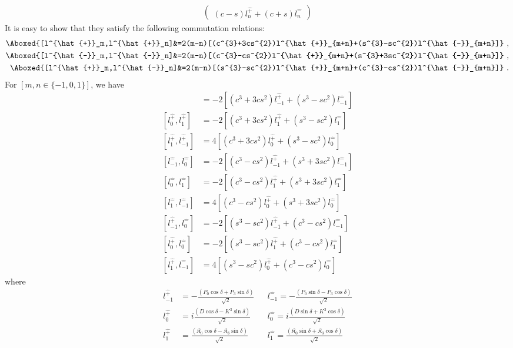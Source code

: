 \documentclass[]{article}
\numberwithin{equation}{section}
\begin{document}
{{\begin{align}
\begin{pmatrix}
        (c-s)l^{\hat{+}}_n+(c+s)l^{\hat{-}}_n
    \end{pmatrix}
\end{align}
It is easy to show that they satisfy the following commutation relations:
\begin{align}
    \Aboxed{[l^{\hat{+}}_m,l^{\hat{+}}_n]&=2(m-n)[(c^{3}+3cs^{2})l^{\hat{+}}_{m+n}+(s^{3}-sc^{2})l^{\hat{-}}_{m+n}]}~,\\
    \Aboxed{[l^{\hat{-}}_m,l^{\hat{-}}_n]&=2(m-n)[(c^{3}-cs^{2})l^{\hat{+}}_{m+n}+(s^{3}+3sc^{2})l^{\hat{-}}_{m+n}]}~,\\
    \Aboxed{[l^{\hat{+}}_m,l^{\hat{-}}_n]&=2(m-n)[(s^{3}-sc^{2})l^{\hat{+}}_{m+n}+(c^{3}-cs^{2})l^{\hat{-}}_{m+n}]}~.
\end{align}
For $[m,n\in\{-1,0,1\}]$, we have
\begin{align}
    [l^{\hat{+}}_{-1},l^{\hat{+}}_{0}]&=-2[(c^{3}+3cs^{2})l^{\hat{+}}_{-1}+(s^{3}-sc^{2})l^{\hat{-}}_{-1}]\\
    [l^{\hat{+}}_{0},l^{\hat{+}}_{1}]&=-2[(c^{3}+3cs^{2})l^{\hat{+}}_{1}+(s^{3}-sc^{2})l^{\hat{-}}_{1}]\\
    [l^{\hat{+}}_{1},l^{\hat{+}}_{-1}]&=4[(c^{3}+3cs^{2})l^{\hat{+}}_{0}+(s^{3}-sc^{2})l^{\hat{-}}_{0}]\\
    [l^{\hat{-}}_{-1},l^{\hat{-}}_{0}]&=-2[(c^{3}-cs^{2})l^{\hat{+}}_{-1}+(s^{3}+3sc^{2})l^{\hat{-}}_{-1}]\\
    [l^{\hat{-}}_{0},l^{\hat{-}}_{1}]&=-2[(c^{3}-cs^{2})l^{\hat{+}}_{1}+(s^{3}+3sc^{2})l^{\hat{-}}_{1}]\\
    [l^{\hat{-}}_{1},l^{\hat{-}}_{-1}]&=4[(c^{3}-cs^{2})l^{\hat{+}}_{0}+(s^{3}+3sc^{2})l^{\hat{-}}_{0}]\\
    [l^{\hat{+}}_{-1},l^{\hat{-}}_{0}]&=-2[(s^{3}-sc^{2})l^{\hat{+}}_{-1}+(c^{3}-cs^{2})l^{\hat{-}}_{-1}]\\
    [l^{\hat{+}}_{0},l^{\hat{-}}_{0}]&=-2[(s^{3}-sc^{2})l^{\hat{+}}_{1}+(c^{3}-cs^{2})l^{\hat{-}}_{1}]\\
    [l^{\hat{+}}_{1},l^{\hat{-}}_{-1}]&=4[(s^{3}-sc^{2})l^{\hat{+}}_{0}+(c^{3}-cs^{2})l^{\hat{-}}_{0}]
\end{align}
where
\begin{align}
    l^{\hat{+}}_{-1}&=-\frac{(P_{0}\cos{\delta}+P_{3}\sin{\delta})}{\sqrt{2}} &&l^{\hat{-}}_{-1}=-\frac{(P_{0}\sin{\delta}-P_{3}\cos{\delta})}{\sqrt{2}}\\
    l^{\hat{+}}_{0}&=i\frac{(D\cos{\delta}-K^{3}\sin{\delta})}{\sqrt{2}} &&l^{\hat{-}}_{0}=i\frac{(D\sin{\delta}+K^{3}\cos{\delta})}{\sqrt{2}}\\
    l^{\hat{+}}_{1}&=\frac{(\mathfrak{K}_{0}\cos{\delta}-\mathfrak{K}_{3}\sin{\delta})}{\sqrt{2}} &&l^{\hat{-}}_{1}=\frac{(\mathfrak{K}_{0}\sin{\delta}+\mathfrak{K}_{3}\cos{\delta})}{\sqrt{2}}
\end{align}
}}
\end{document}
